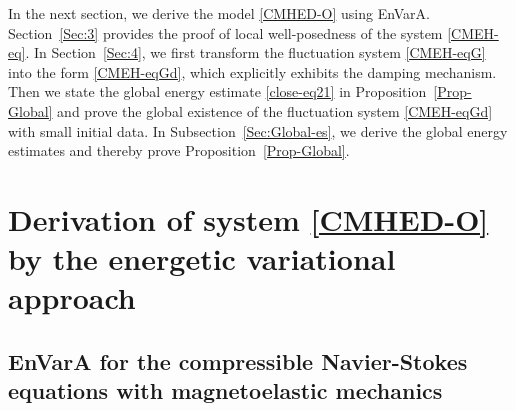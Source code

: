 \documentclass[reqno,11pt]{amsart}
\numberwithin{equation}{section}
\begin{document}
In the next section, we derive the model \eqref{CMHED-O} using EnVarA. Section~\ref{Sec:3} provides the proof of local well-posedness of the system \eqref{CMEH-eq}. In Section~\ref{Sec:4}, we first transform the fluctuation system \eqref{CMEH-eqG} into the form \eqref{CMEH-eqGd}, which explicitly exhibits the damping mechanism. Then we state the global energy estimate \eqref{close-eq21} in Proposition~\ref{Prop-Global} and prove the global existence of the fluctuation system \eqref{CMEH-eqGd} with small initial data. In Subsection~\ref{Sec:Global-es}, we derive the global energy estimates and thereby prove Proposition~\ref{Prop-Global}.


\section{Derivation of system \eqref{CMHED-O} by the energetic variational approach}\label{Sec:EnVarA}

\subsection{EnVarA for the compressible Navier-Stokes equations with magnetoelastic mechanics}
\end{document}

